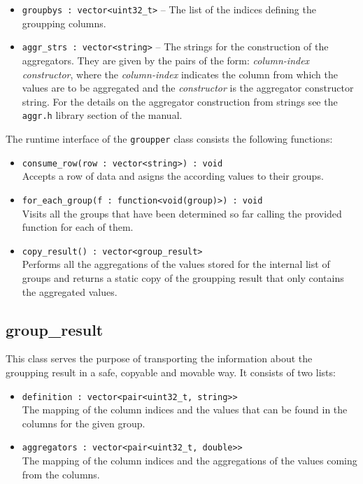 \documentclass{report}
\begin{document}
	\begin{itemize}
		\item \texttt{groupbys : vector<uint32\_t>} -- The list of the
			indices defining the groupping columns.
		\item \texttt{aggr\_strs : vector<string>} -- The strings for
			the construction of the aggregators. They are given by
			the pairs of the form: \textit{column-index constructor},
			where the \textit{column-index} indicates the column from
			which the values are to be aggregated and the
			\textit{constructor} is the aggregator constructor string.
			For the details on the aggregator construction from strings
			see the \texttt{aggr.h} library section of the manual.
	\end{itemize}

	The runtime interface of the \texttt{groupper} class consists the following
	functions:

	\begin{itemize}
		\item \texttt{consume\_row(row : vector<string>) : void}\\
			Accepts a row of data and asigns the according values to
			their groups.
		\item \texttt{for\_each\_group(f : function<void(group)>) : void}\\
			Visits all the groups that have been determined so far
			calling the provided function for each of them.
		\item \texttt{copy\_result() : vector<group\_result>}\\
			Performs all the aggregations of the values stored for the
			internal list of groups and returns a static copy of
			the groupping result that only contains the aggregated
			values.
	\end{itemize}

	\subsection{group\_result}
	This class serves the purpose of transporting the
	information about the groupping result in a safe, copyable and movable
	way. It consists of two lists:

	\begin{itemize}
		\item \texttt{definition : vector<pair<uint32\_t, string>>}\\
			The mapping of the column indices and the values that
			can be found in the columns for the given group.
		\item \texttt{aggregators : vector<pair<uint32\_t, double>>}\\
			The mapping of the column indices and the aggregations
			of the values coming from the columns.
	\end{itemize}
\end{document}
